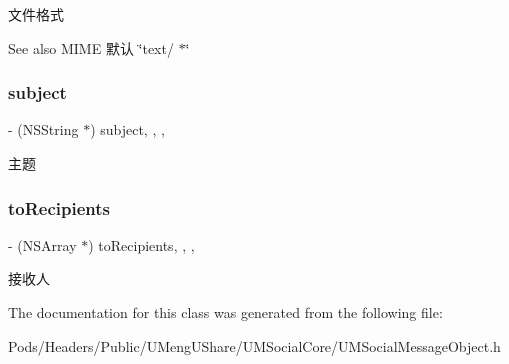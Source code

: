 文件格式 \begin{DoxySeeAlso}{See also}
M\+I\+ME 默认 \char`\"{}text/ $\ast$\char`\"{} 
\end{DoxySeeAlso}
\mbox{\label{interface_u_m_share_email_object_a7835f2a5fec3cad02ae6c92c9d9ab9c9}} 
\subsubsection{\texorpdfstring{subject}{subject}}
{\footnotesize\ttfamily -\/ (N\+S\+String $\ast$) subject\hspace{0.3cm}{\ttfamily [read]}, {\ttfamily [write]}, {\ttfamily [nonatomic]}, {\ttfamily [strong]}}

主题 \mbox{\label{interface_u_m_share_email_object_a0db1ef75a2d88afd756bfed0c9e10777}} 
\subsubsection{\texorpdfstring{to\+Recipients}{toRecipients}}
{\footnotesize\ttfamily -\/ (N\+S\+Array $\ast$) to\+Recipients\hspace{0.3cm}{\ttfamily [read]}, {\ttfamily [write]}, {\ttfamily [nonatomic]}, {\ttfamily [strong]}}

接收人 

The documentation for this class was generated from the following file\+:\begin{DoxyCompactItemize}
\item 
Pods/\+Headers/\+Public/\+U\+Meng\+U\+Share/\+U\+M\+Social\+Core/U\+M\+Social\+Message\+Object.\+h\end{DoxyCompactItemize}

